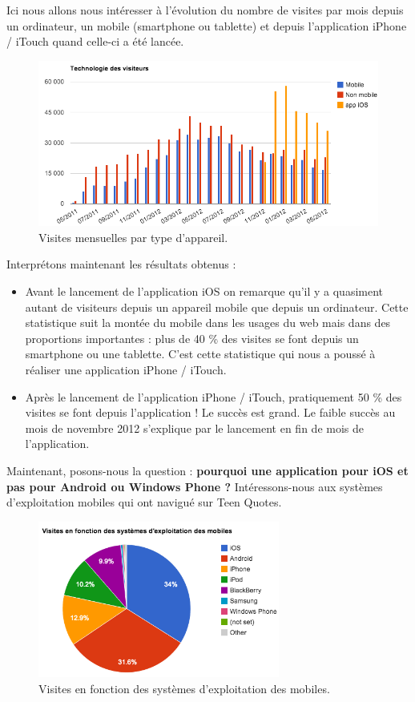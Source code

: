 \documentclass{report}
\begin{document}
	Ici nous allons nous intéresser à l'évolution du nombre de visites par mois depuis un ordinateur, un mobile (smartphone ou tablette) et depuis l'application iPhone / iTouch quand celle-ci a été lancée.
	\begin{figure}[H]
		\center
		\includegraphics[width=500px]{images/visitesParAppareil.png}
		\caption{Visites mensuelles par type d'appareil.}
	\end{figure}
	Interprétons maintenant les résultats obtenus :
	\vspace{10px}
	\begin{itemize}
		\item Avant le lancement de l'application iOS on remarque qu'il y a quasiment autant de visiteurs depuis un appareil mobile que depuis un ordinateur. Cette statistique suit la montée du mobile dans les usages du web mais dans des proportions importantes : plus de 40 \% des visites se font depuis un smartphone ou une tablette. C'est cette statistique qui nous a poussé à réaliser une application iPhone / iTouch.
		\item Après le lancement de l'application iPhone / iTouch, pratiquement 50 \% des visites se font depuis l'application ! Le succès est grand. Le faible succès au mois de novembre 2012 s'explique par le lancement en fin de mois de l'application.
	\end{itemize}
	\vspace{10px}
	Maintenant, posons-nous la question : \textbf{pourquoi une application pour iOS et pas pour Android ou Windows Phone ?} Intéressons-nous aux systèmes d'exploitation mobiles qui ont navigué sur Teen Quotes.
	\begin{figure}[H]
		\center
		\includegraphics[width=300px]{images/OSMobiles.png}
		\caption{Visites en fonction des systèmes d'exploitation des mobiles.}
	\end{figure}
\end{document}
